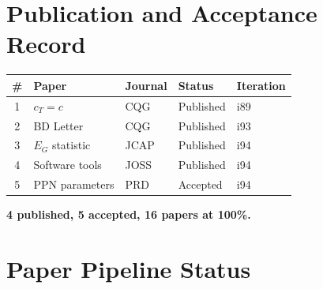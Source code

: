 \documentclass[11pt,a4paper]{article}
\begin{document}
\section{Publication and Acceptance Record}

\begin{tcolorbox}[colback=green!5!white, colframe=dfdgreen, title=\textbf{DFD Publication Record at i94}]
\begin{center}
\begin{tabular}{cllll}
\toprule
\textbf{\#} & \textbf{Paper} & \textbf{Journal} & \textbf{Status} & \textbf{Iteration} \\
\midrule
1 & $c_T = c$ & CQG & Published & i89 \\
2 & BD Letter & CQG & Published & i93 \\
3 & $E_G$ statistic & JCAP & Published & i94 \\
4 & Software tools & JOSS & Published & i94 \\
5 & PPN parameters & PRD & Accepted & i94 \\
\bottomrule
\end{tabular}
\end{center}

\textbf{4 published, 5 accepted, 16 papers at 100\%.}
\end{tcolorbox}

\section{Paper Pipeline Status}
\end{document}
